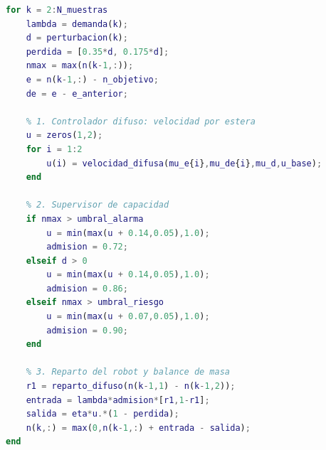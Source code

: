 \begin{lstlisting}[language=Matlab, caption={Bucle de simulación Fase~2: controlador difuso más supervisor de capacidad.}]
for k = 2:N_muestras
    lambda = demanda(k);
    d = perturbacion(k);
    perdida = [0.35*d, 0.175*d];
    nmax = max(n(k-1,:));
    e = n(k-1,:) - n_objetivo;
    de = e - e_anterior;

    % 1. Controlador difuso: velocidad por estera
    u = zeros(1,2);
    for i = 1:2
        u(i) = velocidad_difusa(mu_e{i},mu_de{i},mu_d,u_base);
    end

    % 2. Supervisor de capacidad
    if nmax > umbral_alarma
        u = min(max(u + 0.14,0.05),1.0);
        admision = 0.72;
    elseif d > 0
        u = min(max(u + 0.14,0.05),1.0);
        admision = 0.86;
    elseif nmax > umbral_riesgo
        u = min(max(u + 0.07,0.05),1.0);
        admision = 0.90;
    end

    % 3. Reparto del robot y balance de masa
    r1 = reparto_difuso(n(k-1,1) - n(k-1,2));
    entrada = lambda*admision*[r1,1-r1];
    salida = eta*u.*(1 - perdida);
    n(k,:) = max(0,n(k-1,:) + entrada - salida);
end
\end{lstlisting}


